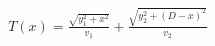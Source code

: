\documentclass[preview]{standalone}
\begin{document}
\begin{align*}
T(x) = \frac{\sqrt{y_1^2 + x^2}}{v_1} + \frac{\sqrt{y_2^2 + (D-x)^2}}{v_2}
\end{align*}
\end{document}
